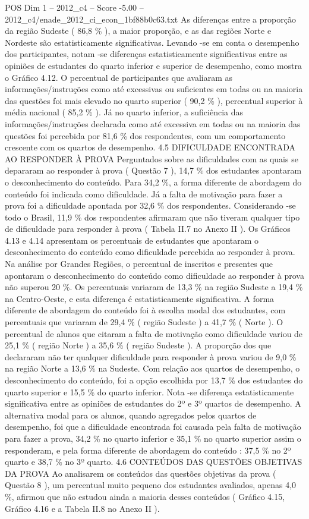\begin{textsample}{POS Dim 1 – 2012\_c4 – Score -5.00 – 2012\_c4/enade\_2012\_ci\_econ\_1bf88b0c63.txt}
As diferenças entre a proporção da região Sudeste ( 86,8 \% ), a maior proporção, e as das regiões Norte e Nordeste são estatisticamente significativas.
Levando -se em conta o desempenho dos participantes, notam -se diferenças estatisticamente significativas entre as opiniões de estudantes do quarto inferior e superior de desempenho, como mostra o Gráfico 4.12.
O percentual de participantes que avaliaram as informações/instruções como até excessivas ou suficientes em todas ou na maioria das questões foi mais elevado no quarto superior ( 90,2 \% ), percentual superior à média nacional ( 85,2 \% ).
Já no quarto inferior, a suficiência das informações/instruções declarada como até excessiva em todas ou na maioria das questões foi percebida por 81,6 \% dos respondentes, com um comportamento crescente com os quartos de desempenho. 4.5 DIFICULDADE ENCONTRADA AO RESPONDER À PROVA Perguntados sobre as dificuldades com as quais se depararam ao responder à prova ( Questão 7 ), 14,7 \% dos estudantes apontaram o desconhecimento do conteúdo.
Para 34,2 \%, a forma diferente de abordagem do conteúdo foi indicada como dificuldade.
Já a falta de motivação para fazer a prova foi a dificuldade apontada por 32,6 \% dos respondentes.
Considerando -se todo o Brasil, 11,9 \% dos respondentes afirmaram que não tiveram qualquer tipo de dificuldade para responder à prova ( Tabela II.7 no Anexo II ).
Os Gráficos 4.13 e 4.14 apresentam os percentuais de estudantes que apontaram o desconhecimento do conteúdo como dificuldade percebida ao responder à prova.
Na análise por Grandes Regiões, o percentual de inscritos e presentes que apontaram o desconhecimento do conteúdo como dificuldade ao responder à prova não superou 20 \%.
Os percentuais variaram de 13,3 \% na região Sudeste a 19,4 \% na Centro-Oeste, e esta diferença é estatisticamente significativa.
A forma diferente de abordagem do conteúdo foi à escolha modal dos estudantes, com percentuais que variaram de 29,4 \% ( região Sudeste ) a 41,7 \% ( Norte ).
O percentual de alunos que citaram a falta de motivação como dificuldade variou de 25,1 \% ( região Norte ) a 35,6 \% ( região Sudeste ).
A proporção dos que declararam não ter qualquer dificuldade para responder à prova variou de 9,0 \% na região Norte a 13,6 \% na Sudeste.
Com relação aos quartos de desempenho, o desconhecimento do conteúdo, foi a opção escolhida por 13,7 \% dos estudantes do quarto superior e 15,5 \% do quarto inferior.
Nota -se diferença estatisticamente significativa entre as opiniões de estudantes do 2º e 3º quartos de desempenho.
A alternativa modal para os alunos, quando agregados pelos quartos de desempenho, foi que a dificuldade encontrada foi causada pela falta de motivação para fazer a prova, 34,2 \% no quarto inferior e 35,1 \% no quarto superior assim o responderam, e pela forma diferente de abordagem do conteúdo : 37,5 \% no 2º quarto e 38,7 \% no 3º quarto. 4.6 CONTEÚDOS DAS QUESTÕES OBJETIVAS DA PROVA Ao analisarem os conteúdos das questões objetivas da prova ( Questão 8 ), um percentual muito pequeno dos estudantes avaliados, apenas 4,0 \%, afirmou que não estudou ainda a maioria desses conteúdos ( Gráfico 4.15, Gráfico 4.16 e a Tabela II.8 no Anexo II ).

\end{textsample}
